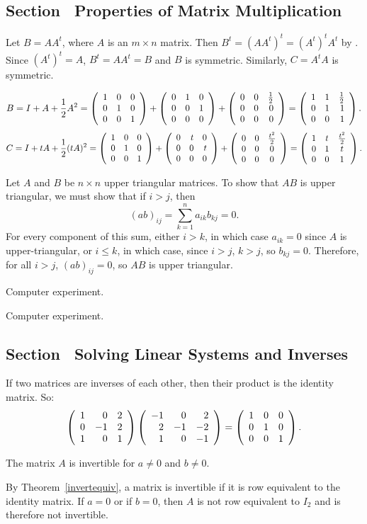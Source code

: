 \documentclass{ximera}
\begin{document}
\subsection*{Section~\protect{\ref{S:4.7}} Properties of Matrix Multiplication}

  Let $B = AA^t$, where $A$ is an $m \times n$ matrix.
Then $B^t = (AA^t)^t = (A^t)^tA^t$ by .  Since
$(A^t)^t=A$, $B^t=AA^t=B$ and $B$ is symmetric.  Similarly, $C = A^tA$
is symmetric.

\[ 
B = I + A + \frac{1}{2}A^2 =
 \left(\begin{array}{rrr} 1 & 0 & 0 \\ 0 & 1 & 0 \\ 0 & 0 & 1\end{array}\right) +
\left(\begin{array}{rrr} 0 & 1 & 0 \\ 0 & 0 & 1 \\ 0 & 0 & 0\end{array}\right) +
\left(\begin{array}{rrr} 0 & 0 & \frac{1}{2} \\ 0 & 0 & 0 \\ 0 & 0 & 0\end{array}\right)
= \left(\begin{array}{rrr} 1 & 1 & \frac{1}{2} \\ 0 & 1 & 1 \\ 0 & 0 & 1\end{array}\right). \]
\[ 
C = I + tA + \frac{1}{2}(tA)^2 
= \left(\begin{array}{rrr} 1 & 0 & 0 \\ 0 & 1 & 0 \\ 0 & 0 & 1\end{array}\right) +
\left(\begin{array}{rrr} 0 & t & 0 \\ 0 & 0 & t \\ 0 & 0 & 0\end{array}\right) +
\left(\begin{array}{ccc} 0 & 0 & \frac{t^2}{2} \\ 0 & 0 & 0 \\ 0 & 0 & 0\end{array}\right)
= \left(\begin{array}{ccc} 1 & t & \frac{t^2}{2} \\ 0 & 1 & t \\ 0 & 0 & 1\end{array}\right). \]

Let $A$ and $B$ be $n \times n$ upper triangular matrices.  To show
that $AB$ is upper triangular, we must show that if $i > j$, then
\[ (ab)_{ij} = \sum_{k = 1}^{n} a_{ik}b_{kj} = 0. \]
For every component of this sum, either $i > k$, in which case $a_{ik}
= 0$ since $A$ is upper-triangular, or $i \leq k$, in which case, since
$i > j$, $k > j$, so $b_{kj} = 0$.  Therefore, for all $i > j$,
$(ab)_{ij} = 0$, so $AB$ is upper triangular.

 Computer experiment.

 Computer experiment.



\subsection*{Section~\protect{\ref{S:SLS}} Solving Linear Systems and Inverses}

If two matrices are inverses of each other, then their product is the
identity matrix.  So:
\[ \left(\begin{array}{rrr} 1 & 0 & 2 \\ 0 & -1 & 2 \\ 1 & 0 & 1\end{array}\right)
\left(\begin{array}{rrr} -1 & 0 & 2 \\ 2 & -1 & -2 \\ 1 & 0 & -1\end{array}\right) =
\left(\begin{array}{rrr} 1 & 0 & 0 \\ 0 & 1 & 0 \\ 0 & 0 & 1\end{array}\right). \]

\ans The matrix $A$ is invertible for $a \neq 0$ and $b \neq 0$.

\soln By Theorem~\ref{invertequiv}, a matrix is invertible if it is row
equivalent to the identity matrix.  If $a = 0$ or if $b = 0$, then
$A$ is not row equivalent to $I_2$ and is therefore not invertible.
\end{document}
